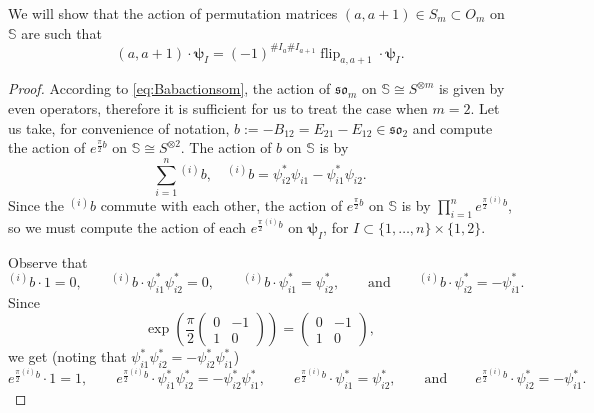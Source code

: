 \documentclass[10pt]{amsart}
\numberwithin{equation}{section}
\theoremstyle{definition}
\newcommand{\som}[1][m]{\mathfrak{so}_{#1}}
\newcommand{\ot}{\otimes}
\newcommand{\flip}{\operatorname{flip}}
\newcommand{\hwp}{\boldsymbol{\psi}}
\newcommand{\howespin}{\boldsymbol{\mathbb{S}}}
\begin{document}
    We will show that the action of permutation matrices $(a,a+1)\in  S_m\subset O_m$ on $\howespin$ are such that
    \[
    (a,a+1)\cdot \hwp_I=(-1)^{\#I_a\#I_{a+1}}\flip_{a,a+1}\cdot\hwp_I.
    \]

\begin{proof}
    According to \eqref{eq:Babactionsom}, the action of $\som$ on $\howespin\cong S^{\ot m}$ is given by even operators, therefore it is sufficient for us to treat the case when $m=2$. Let us take, for convenience of notation, $b:=-B_{12}=E_{21}-E_{12}\in \mathfrak{so}_2$ and compute the action of $e^{\frac{\pi}{2}b}$ on $\howespin\cong S^{\ot2}$. The action of $b$ on $\howespin$ is by
    \[
    \sum_{i=1}^n{}^{(i)}b, \quad {}^{(i)}b=\psi_{i2}^*\psi_{i1}-\psi_{i1}^*\psi_{i2}.
    \]
    Since the ${}^{(i)}b$ commute with each other, the action of $e^{\frac{\pi}{2}b}$ on $\howespin$ is by $\prod_{i=1}^n e^{\frac{\pi}{2}{}^{(i)}b}$, so we must compute the action of each $e^{\frac{\pi}{2}{}^{(i)}b}$ on $\hwp_I$, for $I\subset \{1, \dots, n\}\times \{1, 2\}$. 

Observe that
    \[
    {}^{(i)}b\cdot 1=0, \qquad {}^{(i)}b\cdot \psi^*_{i1}\psi^*_{i2}=0, \qquad {}^{(i)}b\cdot \psi_{i1}^*=\psi_{i2}^*, \qquad \text{and} \qquad {}^{(i)}b\cdot \psi_{i2}^*=-\psi_{i1}^*.
    \]
    Since
    \[
    \exp \left(\frac{\pi}{2}
    \begin{pmatrix}
        0 & -1\\
        1 & 0
    \end{pmatrix}
    \right)=
    \begin{pmatrix}
        0 & -1\\
        1 & 0
    \end{pmatrix},
    \]
we get (noting that $\psi^*_{i1}\psi^*_{i2}=-\psi^*_{i2}\psi^*_{i1}$)
\begin{equation}\label{eq:expbiaction1}
e^{\frac{\pi}{2}{}^{(i)}b}\cdot 1 = 1, \qquad e^{\frac{\pi}{2}{}^{(i)}b}\cdot \psi^*_{i1}\psi^*_{i2}=-\psi^*_{i2}\psi^*_{i1}, \qquad e^{\frac{\pi}{2}{}^{(i)}b}\cdot \psi_{i1}^* = \psi_{i2}^*, \qquad \text{and} \qquad e^{\frac{\pi}{2}{}^{(i)}b}\cdot \psi_{i2}^*=-\psi_{i1}^*.
\end{equation}
    

\end{proof}
\end{document}
